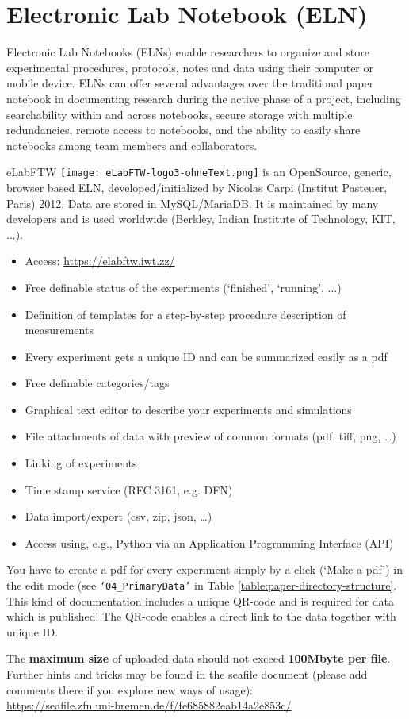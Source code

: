 \section[Electronic Lab Notebook]{Electronic Lab Notebook (ELN)}\label{ssc:ELN}

Electronic Lab Notebooks (ELNs) enable researchers to organize and store
experimental procedures, protocols, notes and data using their computer or
mobile device. ELNs can offer several advantages over the traditional paper
notebook in documenting research during the active phase of a project, including
searchability within and across notebooks, secure storage with multiple
redundancies, remote access to notebooks, and the ability to easily share
notebooks among team members and collaborators.

eLabFTW \texttt{[image: eLabFTW-logo3-ohneText.png]} is an OpenSource, generic, browser based ELN, developed/initialized by
Nicolas Carpi (Institut Pasteuer, Paris) 2012. Data are stored in MySQL/MariaDB.
It is maintained by many developers and is used worldwide (Berkley, Indian
Institute of Technology, KIT, ...).
\begin{itemize}
  \item Access: \url{https://elabftw.iwt.zz/}
  \item Free definable status of the experiments (`finished', `running', ...)
  \item Definition of templates for a step-by-step procedure description of
        measurements
  \item Every experiment gets a unique ID and can be summarized easily as a pdf
  \item Free definable categories/tags
  \item Graphical text editor to describe your experiments and simulations
  \item File attachments of data with preview of common formats (pdf, tiff, png, …)
  \item Linking of experiments
  \item Time stamp service (RFC 3161, e.g. DFN)
  \item Data import/export (csv, zip, json, …)
  \item Access using, e.g., Python via an Application Programming Interface (API)
\end{itemize}

You have to create a pdf for every experiment simply by a click (‘Make a pdf’)
in the edit mode (see \texttt{‘04\_PrimaryData’} in Table
\ref{table:paper-directory-structure}. This kind of documentation includes a
unique QR-code and is required for data which is published! The QR-code enables
a direct link to the data together with unique ID.

The \textbf{maximum size} of uploaded data should not exceed
\textbf{100Mbyte per file}. Further hints and tricks may be found in the seafile
document (please add comments there if you explore new ways of usage): \\
\url{https://seafile.zfn.uni-bremen.de/f/fe685882eab14a2e853c/}
